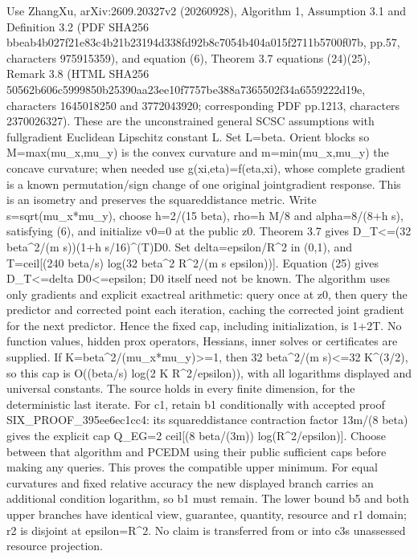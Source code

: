 \documentclass[10pt,a4paper]{article}
\begin{document}
Use ZhangXu, arXiv:2609.20327v2 (20260928), Algorithm 1, Assumption 3.1 and Definition 3.2 (PDF SHA256 bbeab4b027f21e83c4b21b23\allowbreak{}194d338fd92b8c7054b404a0\allowbreak{}15f2711b5700f07b, pp.57, characters 975915359), and equation (6), Theorem 3.7 equations (24)(25), Remark 3.8 (HTML SHA256 50562b606c5999850b25390a\allowbreak{}a23ee10f7757be388a736550\allowbreak{}2f34a6559222d19e, characters 1645018250 and 3772043920; corresponding PDF pp.1213, characters 2370026327). These are the unconstrained general SCSC assumptions with fullgradient Euclidean Lipschitz constant L. Set L=beta. Orient blocks so M=max(mu\_x,mu\_y) is the convex curvature and m=min(mu\_x,mu\_y) the concave curvature; when needed use g(xi,eta)=f(eta,xi), whose complete gradient is a known permutation/sign change of one original jointgradient response. This is an isometry and preserves the squareddistance metric. Write s=sqrt(mu\_x*mu\_y), choose h=2/(15 beta), rho=h M/8 and alpha=8/(8+h s), satisfying (6), and initialize v0=0 at the public z0. Theorem 3.7 gives D\_T<=(32 beta\textasciicircum{}2/(m s))(1+h s/16)\textasciicircum{}(T)D0. Set delta=epsilon/R\textasciicircum{}2 in (0,1), and T=ceil[(240 beta/s) log(32 beta\textasciicircum{}2 R\textasciicircum{}2/(m s epsilon))]. Equation (25) gives D\_T<=delta D0<=epsilon; D0 itself need not be known. The algorithm uses only gradients and explicit exactreal arithmetic: query once at z0, then query the predictor and corrected point each iteration, caching the corrected joint gradient for the next predictor. Hence the fixed cap, including initialization, is 1+2T. No function values, hidden prox operators, Hessians, inner solves or certificates are supplied. If K=beta\textasciicircum{}2/(mu\_x*mu\_y)>=1, then 32 beta\textasciicircum{}2/(m s)<=32 K\textasciicircum{}(3/2), so this cap is O((beta/s) log(2 K R\textasciicircum{}2/epsilon)), with all logarithms displayed and universal constants. The source holds in every finite dimension, for the deterministic last iterate. For c1, retain b1 conditionally with accepted proof SIX\_PROOF\_395ee6ec1cc4: its squareddistance contraction factor 13m/(8 beta) gives the explicit cap Q\_EG=2 ceil[(8 beta/(3m)) log(R\textasciicircum{}2/epsilon)]. Choose between that algorithm and PCEDM using their public sufficient caps before making any queries. This proves the compatible upper minimum. For equal curvatures and fixed relative accuracy the new displayed branch carries an additional condition logarithm, so b1 must remain. The lower bound b5 and both upper branches have identical view, guarantee, quantity, resource and r1 domain; r2 is disjoint at epsilon=R\textasciicircum{}2. No claim is transferred from or into c3s unassessed resource projection.
\end{document}
